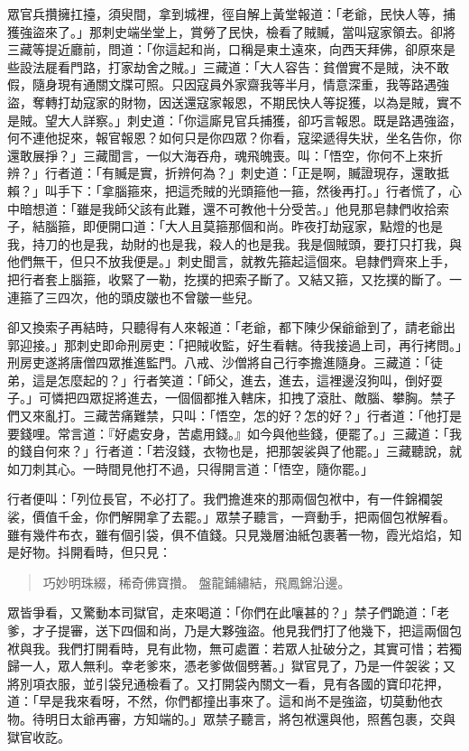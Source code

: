 眾官兵攢擁扛擡，須臾間，拿到城裡，徑自解上黃堂報道：「老爺，民快人等，捕獲強盜來了。」那刺史端坐堂上，賞勞了民快，檢看了賊贓，當叫寇家領去。卻將三藏等提近廳前，問道：「你這起和尚，口稱是東土遠來，向西天拜佛，卻原來是些設法屣看門路，打家劫舍之賊。」三藏道：「大人容告：貧僧實不是賊，決不敢假，隨身現有通關文牒可照。只因寇員外家齋我等半月，情意深重，我等路遇強盜，奪轉打劫寇家的財物，因送還寇家報恩，不期民快人等捉獲，以為是賊，實不是賊。望大人詳察。」刺史道：「你這廝見官兵捕獲，卻巧言報恩。既是路遇強盜，何不連他捉來，報官報恩？如何只是你四眾？你看，寇梁遞得失狀，坐名告你，你還敢展掙？」三藏聞言，一似大海吞舟，魂飛魄喪。叫：「悟空，你何不上來折辨？」行者道：「有贓是實，折辨何為？」刺史道：「正是啊，贓證現存，還敢抵賴？」叫手下：「拿腦箍來，把這禿賊的光頭箍他一箍，然後再打。」行者慌了，心中暗想道：「雖是我師父該有此難，還不可教他十分受苦。」他見那皂隸們收拾索子，結腦箍，即便開口道：「大人且莫箍那個和尚。昨夜打劫寇家，點燈的也是我，持刀的也是我，劫財的也是我，殺人的也是我。我是個賊頭，要打只打我，與他們無干，但只不放我便是。」刺史聞言，就教先箍起這個來。皂隸們齊來上手，把行者套上腦箍，收緊了一勒，扢撲的把索子斷了。又結又箍，又扢撲的斷了。一連箍了三四次，他的頭皮皺也不曾皺一些兒。

卻又換索子再結時，只聽得有人來報道：「老爺，都下陳少保爺爺到了，請老爺出郭迎接。」那刺史即命刑房吏：「把賊收監，好生看轄。待我接過上司，再行拷問。」刑房吏遂將唐僧四眾推進監門。八戒、沙僧將自己行李擔進隨身。三藏道：「徒弟，這是怎麼起的？」行者笑道：「師父，進去，進去，這裡邊沒狗叫，倒好耍子。」可憐把四眾捉將進去，一個個都推入轄床，扣拽了滾肚、敵腦、攀胸。禁子們又來亂打。三藏苦痛難禁，只叫：「悟空，怎的好？怎的好？」行者道：「他打是要錢哩。常言道：『好處安身，苦處用錢。』如今與他些錢，便罷了。」三藏道：「我的錢自何來？」行者道：「若沒錢，衣物也是，把那袈裟與了他罷。」三藏聽說，就如刀刺其心。一時間見他打不過，只得開言道：「悟空，隨你罷。」

行者便叫：「列位長官，不必打了。我們擔進來的那兩個包袱中，有一件錦襴袈裟，價值千金，你們解開拿了去罷。」眾禁子聽言，一齊動手，把兩個包袱解看。雖有幾件布衣，雖有個引袋，俱不值錢。只見幾層油紙包裹著一物，霞光焰焰，知是好物。抖開看時，但只見：
\begin{quote}
巧妙明珠綴，稀奇佛寶攢。
盤龍鋪繡結，飛鳳錦沿邊。
\end{quote}

眾皆爭看，又驚動本司獄官，走來喝道：「你們在此嚷甚的？」禁子們跪道：「老爹，才子提審，送下四個和尚，乃是大夥強盜。他見我們打了他幾下，把這兩個包袱與我。我們打開看時，見有此物，無可處置：若眾人扯破分之，其實可惜；若獨歸一人，眾人無利。幸老爹來，憑老爹做個劈著。」獄官見了，乃是一件袈裟；又將別項衣服，並引袋兒通檢看了。又打開袋內關文一看，見有各國的寶印花押，道：「早是我來看呀，不然，你們都撞出事來了。這和尚不是強盜，切莫動他衣物。待明日太爺再審，方知端的。」眾禁子聽言，將包袱還與他，照舊包裹，交與獄官收訖。

